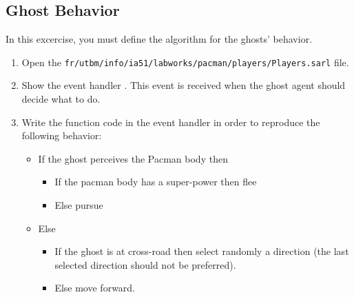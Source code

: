 \documentclass[article,english,nodocumentinfo,nosayenslogo,noicartslogo]{utbmciadreport}
\begin{document}
\subsection{Ghost Behavior}

In this excercise, you must define the algorithm for the ghosts' behavior.
\begin{enumerate}
\item Open the \texttt{fr/utbm/info/ia51/labworks/pacman/players/Players.sarl} file.
\item Show the event handler . This event is received when the ghost agent should decide what to do.
\item Write the function code in the event handler in order to reproduce the following behavior:
	\begin{itemize}
	\item If the ghost perceives the Pacman body then
		\begin{itemize}
		\item If the pacman body has a super-power then flee
		\item Else pursue
		\end{itemize}
	\item Else
		\begin{itemize}
		\item If the ghost is at cross-road then select randomly a direction (the last selected direction should not be preferred).
		\item Else move forward.
		\end{itemize}
	\end{itemize}
\end{enumerate}
\end{document}
